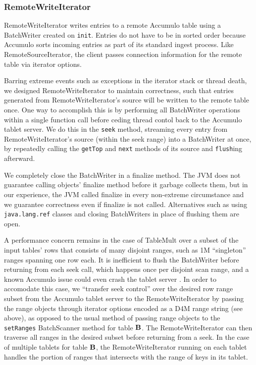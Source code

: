 \subsubsection{RemoteWriteIterator}
RemoteWriteIterator writes entries to a remote Accumulo table using a BatchWriter created on \texttt{init}.
Entries do not have to be in sorted order because Accumulo sorts incoming entries as part of its
standard ingest process. Like RemoteSourceIterator, the client passes connection information 
for the remote table via iterator options.

Barring extreme events such as exceptions in the iterator stack or thread death,
we designed RemoteWriteIterator to maintain correctness, such that entries generated from
RemoteWriteIterator's source will be written to the remote table once.
One way to accomplish this is by performing all BatchWriter operations within a single function call
before ceding thread contol back to the Accumulo tablet server.  We do this in the \texttt{seek} method,
streaming every entry from RemoteWriteIterator's source (within the seek range) into a BatchWriter at once, 
by repeatedly calling the \texttt{getTop} and \texttt{next} methods of its source and \texttt{flush}ing afterward.


We completely close the BatchWriter in a finalize method.
The JVM does not guarantee calling objects' finalize method before it garbage collects them, 
but in our experience, the JVM called finalize in every non-extreme circumstance
and we guarantee correctness even if finalize is not called. Alternatives such as using \texttt{java.lang.ref}
classes and closing BatchWriters in place of flushing them are open.

A performance concern remains in the case of TableMult over a subset of the input tables' rows 
that consists of many disjoint ranges, such as 1M ``singleton'' ranges spanning one row each.
It is inefficient to flush the BatchWriter before returning from each seek call, which happens once per 
disjoint scan range, and a known Accumulo issue could even crash the tablet server \cite{ACCUMULO-3710}.
In order to accomodate this case, we ``transfer seek control'' over the desired row range
subset from the Accumulo tablet server to the RemoteWriteIterator by passing the range objects through 
iterator options encoded as a D4M range string (see above), as opposed to the usual method of 
passing range objects to the \texttt{setRanges} BatchScanner method for table $\mathbf{B}$.
The RemoteWriteIterator can then traverse all ranges in the desired subset before returning from a seek.
In the case of multiple tablets for table $\mathbf{B}$, the RemoteWriteIterator running on each tablet handles 
the portion of ranges that intersects with the range of keys in its tablet.

